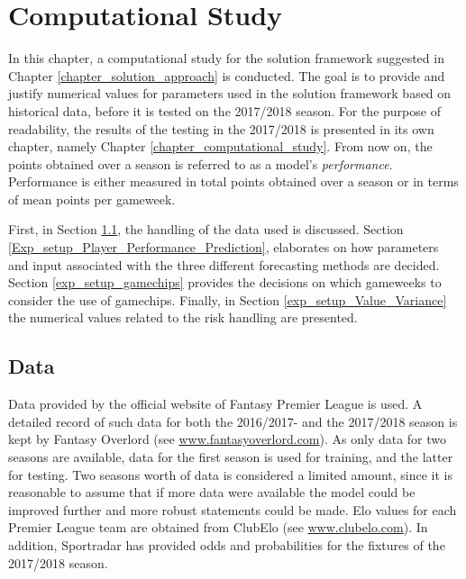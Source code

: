 \chapter{Computational Study}\label{chapter_experimental_setup}


In this chapter, a computational study for the solution framework suggested in Chapter \ref{chapter_solution_approach} is conducted. The goal is to provide and justify numerical values for parameters used in the solution framework based on historical data, before it is tested on the 2017/2018 season. For the purpose of readability, the results of the testing in the 2017/2018 is presented in its own chapter, namely Chapter \ref{chapter_computational_study}. From now on, the points obtained over a season is referred to as a model's \textit{performance}. Performance is either measured in total points obtained over a season or in terms of mean points per gameweek.

\newpar

First, in Section \ref{exp_setup_data}, the handling of the data used is discussed. Section \ref{Exp_setup_Player_Performance_Prediction}, elaborates on how parameters and input associated with the three different forecasting methods are decided. Section \ref{exp_setup_gamechips} provides the decisions on which gameweeks to consider the use of gamechips. Finally, in Section \ref{exp_setup_Value_Variance} the numerical values related to the risk handling are presented.

\section{Data} \label{exp_setup_data}

Data provided by the official website of Fantasy Premier League is used. A detailed record of such data for both the 2016/2017- and the 2017/2018 season is kept by Fantasy Overlord (see \url{www.fantasyoverlord.com}). As only data for two seasons are available, data for the first season is used for training, and the latter for testing. Two seasons worth of data is considered a limited amount, since it is reasonable to assume that if more data were available the model could be improved further and more robust statements could be made. Elo values for each Premier League team are obtained from ClubElo (see \url{www.clubelo.com}). In addition, Sportradar has provided odds and probabilities for the fixtures of the 2017/2018 season. 

